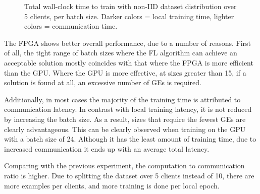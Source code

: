 \begin{figure}[H]
    \caption[ non-IID distribution, total time per GE ]{Total wall-clock time to train with non-IID dataset distribution over 5 clients, per batch size. Darker colors = local training time, lighter colors = communication time. }
    \label{fig: nonIID, total time}
\end{figure}

The FPGA shows better overall performance, due to a number of reasons. First of all, the tight range of batch sizes where the FL algorithm can achieve an acceptable solution mostly coincides with that where the FPGA is more efficient than the GPU. Where the GPU is more effective, at sizes greater than 15, if a solution is found at all, an excessive number of GEs is required. %

Additionally, in most cases the majority of the training time is attributed to communication latency. In contrast with local training latency, it is not reduced by increasing the batch size. As a result, sizes that require the fewest GEs are clearly advantageous. This can be clearly observed when training on the GPU with a batch size of 24. Although it has the least amount of training time, due to increased communication it ends up with an average total latency. %

Comparing with the previous experiment, the computation to communication ratio is higher. Due to splitting the dataset over 5 clients instead of 10, there are more examples per clients, and more training is done per local epoch.

